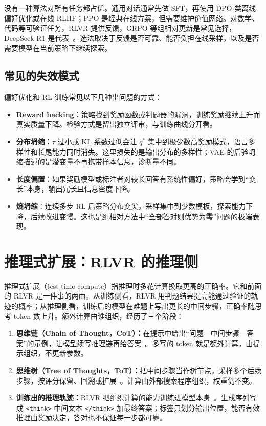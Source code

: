 没有一种算法对所有任务都占优。通用对话通常先做 SFT，再使用 DPO 类离线偏好优化或在线 RLHF；PPO 是经典在线方案，但需要维护价值网络。对数学、代码等可验证任务，RLVR 提供反馈，GRPO 等组相对更新是常见选择，DeepSeek-R1 是代表~\cite{deepseekr1}。选法取决于反馈是否可靠、能否负担在线采样，以及是否需要模型在当前策略下继续探索。

\subsection{常见的失效模式}

偏好优化和 RL 训练常见以下几种出问题的方式：

\begin{itemize}
  \item \textbf{Reward hacking}：策略找到奖励函数或判题器的漏洞，训练奖励继续上升而真实质量下降。检验方式是留出独立评审，与训练曲线分开看。
  \item \textbf{分布坍缩}：\(\tau\) 过小或 KL 系数过低会让 \(q^*\) 集中到极少数高奖励模式，语言多样性和长尾能力同时消失。这里损失的是输出分布的多样性；VAE 的后验坍缩描述的是潜变量不再携带样本信息，诊断量不同。
  \item \textbf{长度偏置}：如果奖励模型或标注者对较长回答有系统性偏好，策略会学到“变长”本身，输出冗长且信息密度下降。
  \item \textbf{熵坍缩}：连续多步 RL 后策略分布变尖，采样集中到少数模板，探索能力下降，后续改进变慢。这也是组相对方法中“全部答对则优势为零”问题的极端表现。
\end{itemize}

\section{推理式扩展：RLVR 的推理侧}
\label{sec:test-time-scaling}

推理式扩展（test-time compute）指推理时多花计算换取更高的正确率。它和前面的 RLVR 是一件事的两面。从训练侧看，RLVR 用判题结果提高能通过验证的轨迹的概率；从推理侧看，训练后的模型在难题上写出更长的中间步骤，正确率随思考 token 数上升。额外计算由谁组织，经历了三个阶段：

\begin{enumerate}[leftmargin=*,itemsep=2mm]
  \item \textbf{思维链（Chain of Thought，CoT）：}在提示中给出“问题—中间步骤—答案”的示例，让模型续写推理链再给答案~\cite{wei2022cot}。多写的 token 就是额外计算，由提示组织，不更新参数。
  \item \textbf{思维树（Tree of Thoughts，ToT）：}把中间步骤当作树节点，采样多个后续步骤，按评分保留、回溯或扩展~\cite{yao2023tot}。计算由外部搜索程序组织，权重仍不变。
  \item \textbf{训练出的推理轨迹：}RLVR 把组织计算的能力训练进模型本身~\cite{deepseekr1}。生成序列写成 \texttt{<think>} 中间文本 \texttt{</think>} 加最终答案；标签只划分输出位置，能否有效推理由奖励决定，答对也不保证每一步都可靠。
\end{enumerate}


